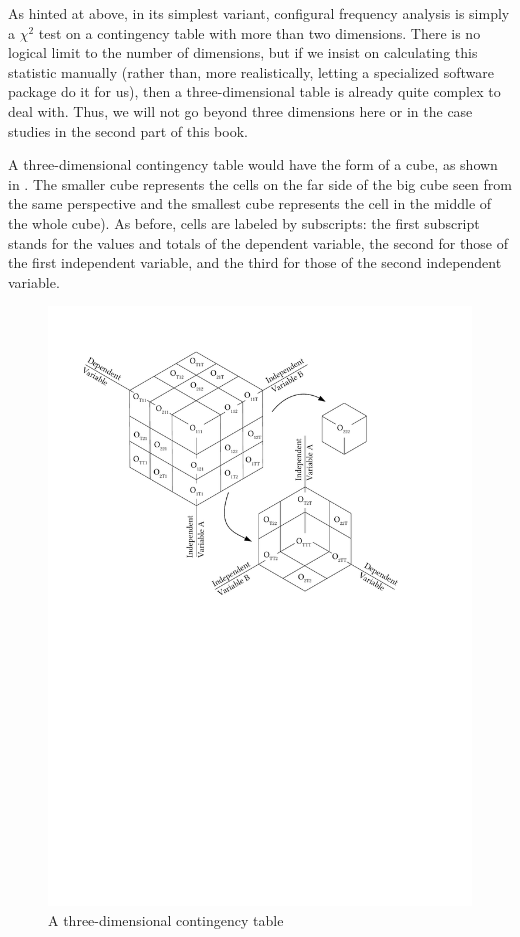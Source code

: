 
As hinted at above, in its simplest variant, configural  frequency analysis is simply a $\chi^2$  test on a contingency  table with more than two dimensions. There is no logical limit to the number of dimensions, but if we insist on calculating this statistic manually (rather than, more realistically, letting a specialized software package do it for us), then a three\hyp{}dimensional table is already quite complex to deal with. Thus, we will not go beyond three dimensions here or in the case studies in the second part of this book.

A three\hyp{}dimensional contingency  table would have the form of a cube, as shown in . The smaller cube represents the cells on the far side of the big cube seen from the same perspective and the smallest cube represents the cell in the middle of the whole cube). As before, cells are labeled by subscripts: the first subscript stands for the values and totals of the dependent variable, the second for those of the first independent variable, and the third for those of the second independent variable.

\begin{figure}
\caption{A three\hyp{}dimensional contingency table}
\label{fig:cfaschematic}
\includegraphics[width=\textwidth,keepaspectratio]{figures/cfaschematic}
\end{figure}

